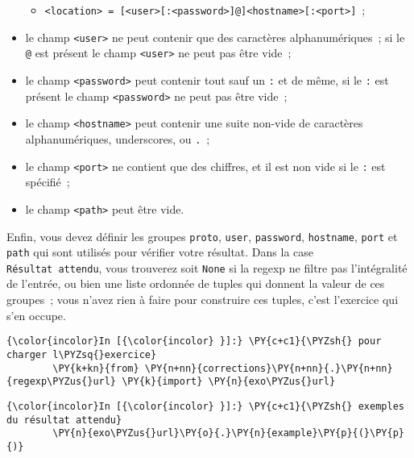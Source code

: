 \begin{itemize}
  \begin{itemize}
  \tightlist
  \item
    \texttt{\textless{}location\textgreater{}\ =\ {[}\textless{}user\textgreater{}{[}:\textless{}password\textgreater{}{]}@{]}\textless{}hostname\textgreater{}{[}:\textless{}port\textgreater{}{]}}~;
  \end{itemize}
\item
  le champ \texttt{\textless{}user\textgreater{}} ne peut contenir que
  des caractères alphanumériques~; si le \texttt{@} est présent le champ
  \texttt{\textless{}user\textgreater{}} ne peut pas être vide~;
\item
  le champ \texttt{\textless{}password\textgreater{}} peut contenir tout
  sauf un \texttt{:} et de même, si le \texttt{:} est présent le champ
  \texttt{\textless{}password\textgreater{}} ne peut pas être vide~;
\item
  le champ \texttt{\textless{}hostname\textgreater{}} peut contenir une
  suite non-vide de caractères alphanumériques, underscores, ou
  \texttt{.}~;
\item
  le champ \texttt{\textless{}port\textgreater{}} ne contient que des
  chiffres, et il est non vide si le \texttt{:} est spécifié~;
\item
  le champ \texttt{\textless{}path\textgreater{}} peut être vide.
\end{itemize}

Enfin, vous devez définir les groupes \texttt{proto}, \texttt{user},
\texttt{password}, \texttt{hostname}, \texttt{port} et \texttt{path} qui
sont utilisés pour vérifier votre résultat. Dans la case
\texttt{Résultat\ attendu}, vous trouverez soit \texttt{None} si la
regexp ne filtre pas l'intégralité de l'entrée, ou bien une liste
ordonnée de tuples qui donnent la valeur de ces groupes~; vous n'avez
rien à faire pour construire ces tuples, c'est l'exercice qui s'en
occupe.

    \begin{Verbatim}[commandchars=\\\{\}]
{\color{incolor}In [{\color{incolor} }]:} \PY{c+c1}{\PYZsh{} pour charger l\PYZsq{}exercice}
        \PY{k+kn}{from} \PY{n+nn}{corrections}\PY{n+nn}{.}\PY{n+nn}{regexp\PYZus{}url} \PY{k}{import} \PY{n}{exo\PYZus{}url}
\end{Verbatim}


    \begin{Verbatim}[commandchars=\\\{\}]
{\color{incolor}In [{\color{incolor} }]:} \PY{c+c1}{\PYZsh{} exemples du résultat attendu}
        \PY{n}{exo\PYZus{}url}\PY{o}{.}\PY{n}{example}\PY{p}{(}\PY{p}{)}
\end{Verbatim}


